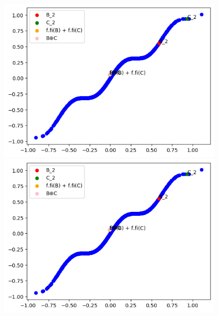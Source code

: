\documentclass{report}
\begin{document}
\begin{figure}[h]
\begin{minipage}{0.5\textwidth}
\begin{minipage}{0.5\textwidth}
                    \includegraphics[width=0.9\linewidth]{./images/2.png}
                \end{minipage}
                    \includegraphics[width=0.9\linewidth]{./images/2.png}
                \end{minipage}
            \end{figure}
            
\end{document}

